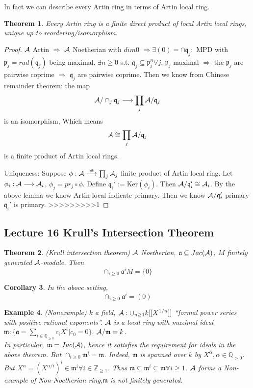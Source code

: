 \documentclass[11pt]{article}
\newtheorem{thm}{Theorem}[section]
\newtheorem{cor}[thm]{Corollary}
\newtheorem{ex}[thm]{Example}
\newcommand{\intg}{\mathbb Z}
\newcommand{\ratl}{\mathbb Q}
\newcommand{\sca}{{\mathfrak a}}
\newcommand{\scm}{{\mathfrak m}}
\newcommand{\scp}{{\mathfrak p}}
\newcommand{\scq}{\mathfrak q}
\newcommand{\cala}{{\cal A}}
\newcommand{\Lrta}{\Longrightarrow}
\newcommand{\lrta}{\longrightarrow}
\begin{document}
In fact we can describe every Artin ring in terms of Artin local ring.
\begin{thm}\label{thm:Artin_product_of_Artin_local}
Every Artin ring is a finite direct product of local Artin local rings, unique up to reordering/isomorphism.
\end{thm}
\begin{proof}
$\cala$ Artin $\Lrta $ $\cala$ Noetherian with $dim 0$ $\Lrta\exists (0)=\cap\scq_j:$ MPD with $\scp_j=rad(\scq_j)$ being maximal. $\exists n\geq 0$  s.t. $\scq_j\subseteq \scp_j^n\forall j$, $\scp_j$ maximal $\Lrta$ the $\scp_j$ are pairwise coprime $\Lrta$ $\scq_j$ are pairwise coprime. Then we know from Chinese remainder theorem:
the map
$$
\cala/\cap_j\scq_j\lrta \prod_j \cala/\scq_j
$$
 is an isomorphism,
 Which means 
 $$
\cala\cong\prod_j \cala/\scq_j
 $$
is a finite product of Artin local rings.

Uniqueness: Suppose $\phi:\cala\overset{\cong}{\lrta}\prod_j\cala_j$ finite product of Artin local ring. Let $\phi_i:\cala\lrta \cala_i$, $\phi_j=pr_j\circ\phi$. Define $\scq_i':=\text{Ker}(\phi_i)$. Then $\cala/\scq'_i\cong \cala_i$. By the above lemma we know Artin local indicate primary. Then we know $\cala/\scq_i'$ primary $\scq_i'$ is primary.
>>>>>>>>>1
\end{proof}

\subsection{Lecture 16 Krull's Intersection Theorem}

\begin{thm}\label{thm:Krull_intersection}(Krull intersection theorem)
$\cala$ Noetherian, $\sca\subseteq Jac(\cala)$, $M$ finitely generated $\cala$-module.
Then
$$
\cap_{i\geq 0}\sca^i M=\{0\}
$$
\end{thm}
\begin{cor}
In the above setting, 
$$
\cap_{i\geq 0}\sca^i=(0)
$$
\end{cor}
\begin{ex}
(Nonexample) $k$ a field, $\cala:\cup_{n\geq 1}k[[X^{1/n}]]$ ``formal power series with positive rational exponents''. $\cala$ is a local ring with maximal ideal $\scm:\{\sca=\sum_{i\in\ratl_{\geq 0}}c_i X^i|c_0=0\}.$ $\cala/\scm=k$.\\
In particular, $\scm=Jac(\cala)$, hence it satisfies the requirement for ideals in the above theorem. But $\cap_{i\geq 0}\scm^i=\scm$. Indeed, $\scm$ is spanned over $k$  by $X^\alpha,\alpha\in\ratl_{>0}$. But $X^\alpha=(X^{\alpha/i})^i\in\scm^i\forall i\in\intg_{\geq 1}$. Thus $\scm\subseteq \scm^i\subseteq \scm\forall i\geq 1$. $\cala$ forms a Non-example of Non-Noetherian ring,$\scm$ is not finitely generated. 
\end{ex}
\end{document}
